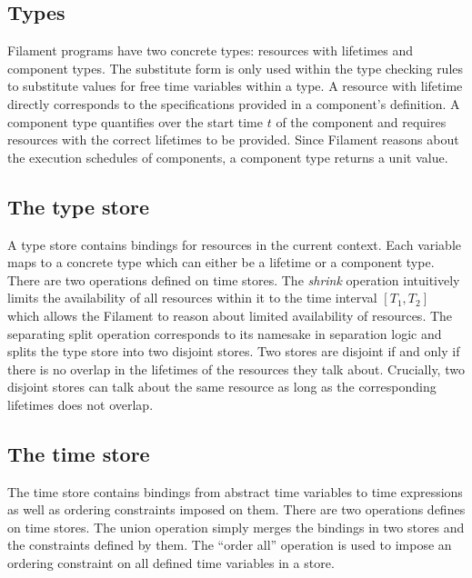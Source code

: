 \documentclass[acmsmall,review,anonymous]{acmart}
\begin{document}
\subsection{Types}

Filament programs have two concrete types: resources with lifetimes and component
types.
The substitute form is only used within the type checking rules to substitute
values for free time variables within a type.
A resource with lifetime directly corresponds to the specifications provided
in a component's definition.
A component type quantifies over the start time $t$ of the component and requires
resources with the correct lifetimes to be provided.
Since Filament reasons about the execution schedules of components, a component
type returns a unit value.


\subsection{The type store}

A type store contains bindings for resources in the current context.
Each variable maps to a concrete type which can either be a lifetime or a
component type.
There are two operations defined on time stores.
The \emph{shrink} operation intuitively limits the availability of all
resources within it to the time interval $[T_1, T_2]$ which allows the Filament
to reason about limited availability of resources.
The separating split operation corresponds to its namesake in separation logic
and splits the type store into two disjoint stores.
Two stores are disjoint if and only if there is no overlap in the lifetimes of the
resources they talk about.
Crucially, two disjoint stores can talk about the same resource as long as the
corresponding lifetimes does not overlap.

\subsection{The time store}

The time store contains bindings from abstract time variables to time
expressions as well as ordering constraints imposed on them.
There are two operations defines on time stores.
The union operation simply merges the bindings in two stores and the constraints
defined by them.
The ``order all'' operation is used to impose an ordering constraint on all
defined time variables in a store.
\end{document}
